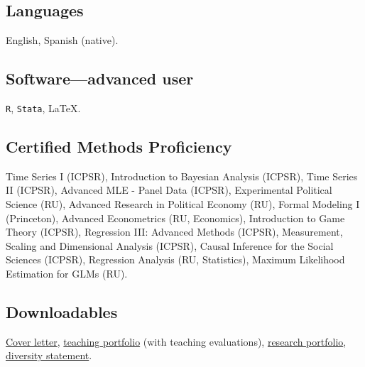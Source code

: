 \subsection*{Languages}
English, Spanish (native).


\subsection*{Software---advanced user}
\texttt{R}, \texttt{Stata}, \LaTeX.

\subsection*{Certified Methods Proficiency}
Time Series I (ICPSR), Introduction to Bayesian Analysis (ICPSR), Time Series II (ICPSR), Advanced MLE - Panel Data (ICPSR), Experimental Political Science (RU), Advanced Research in Political Economy (RU), Formal Modeling I (Princeton), Advanced Econometrics (RU, Economics), Introduction to Game Theory (ICPSR), Regression III: Advanced Methods (ICPSR), Measurement, Scaling and Dimensional Analysis (ICPSR), Causal Inference for the Social Sciences (ICPSR), Regression Analysis (RU, Statistics), Maximum Likelihood Estimation for GLMs (RU).

\subsection*{Downloadables}
\href{https://github.com/hbahamonde/Job_Market/raw/master/Bahamonde_Cover_Letter.pdf}{Cover letter}, \href{https://github.com/hbahamonde/Job_Market/raw/master/Bahamonde_Teaching_Portafolio.pdf}{teaching portfolio} (with teaching evaluations), \href{https://github.com/hbahamonde/Job_Market/raw/master/Bahamonde_Teaching_Portafolio.pdf}{research portfolio}, \href{https://github.com/hbahamonde/Job_Market/raw/master/Bahamonde_Diversity_Statement.pdf}{diversity statement}.